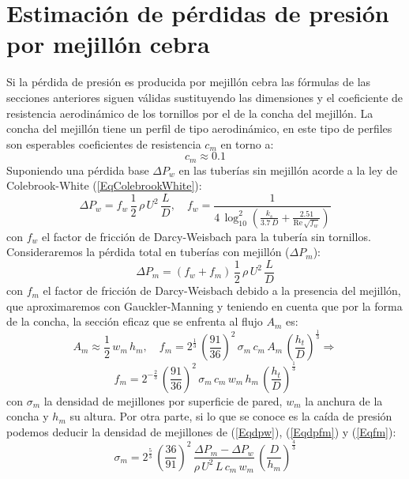 \documentclass[a4paper]{article}
\newcommand{\EQ}[2]{\begin{equation}#1\label{#2}\end{equation}}
\begin{document}
\section{Estimación de pérdidas de presión por mejillón cebra}

Si la pérdida de presión es producida por mejillón cebra las fórmulas de las
secciones anteriores siguen válidas sustituyendo las dimensiones y el
coeficiente de resistencia aerodinámico de los tornillos por el de la concha del
mejillón. La concha del mejillón tiene un perfil de tipo aerodinámico, en este
tipo de perfiles son esperables coeficientes de resistencia $c_m$ en torno a:
\EQ{c_m\approx0.1}{Eqcm}
Suponiendo una pérdida base $\Delta P_w$ en las tuberías sin mejillón acorde a
la ley de Colebrook-White (\ref{EqColebrookWhite}):
\EQ
{
	\Delta P_w=f_w\,\frac12\,\rho\,U^2\,\frac{L}{D},\quad
	f_w=\frac1{4\,\log_{10}^2\left(\frac{k_s}{3.7\,D}
	+\frac{2.51}{\mathrm{Re}\,\sqrt{f_w}}\right)}
}{Eqdpw}
con $f_w$ el factor de fricción de Darcy-Weisbach para la tubería sin tornillos.
Consideraremos la pérdida total en tuberías con mejillón ($\Delta P_m$):
\EQ{\Delta P_m=\left(f_w+f_m\right)\,\frac12\,\rho\,U^2\,\frac{L}{D}}{Eqdpfm}
con $f_m$ el factor de fricción de Darcy-Weisbach debido a la presencia del
mejillón, que aproximaremos con Gauckler-Manning y teniendo en cuenta que
por la forma de la concha, la sección eficaz que se enfrenta al flujo $A_m$ es:
\[
  A_m\approx\frac12\,w_m\,h_m,\quad
  f_m=2^{\frac13}\,\left(\frac{91}{36}\right)^2\,\sigma_m\,c_m\,A_m
  \,\left(\frac{h_t}{D}\right)^{\frac13}\Rightarrow
\]
\EQ
{
  f_m=2^{-\frac23}\,\left(\frac{91}{36}\right)^2\,\sigma_m\,c_m\,w_m\,h_m
  \,\left(\frac{h_t}{D}\right)^{\frac13}
}{Eqfm}
con $\sigma_m$ la densidad de mejillones por superficie de pared, $w_m$ la
anchura de la concha y $h_m$ su altura. Por otra parte, si lo que se conoce es
la caída de presión podemos deducir la densidad de mejillones de (\ref{Eqdpw}),
(\ref{Eqdpfm}) y (\ref{Eqfm}):
\EQ
{
  \sigma_m=2^\frac53\,\left(\frac{36}{91}\right)^2
  \,\frac{\Delta P_m-\Delta P_w}{\rho\,U^2\,L\,c_m\,w_m}
  \,\left(\frac{D}{h_m}\right)^{\frac43}
}{Eqsigmam}
\end{document}
